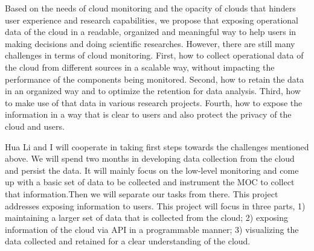   Based on the needs of cloud monitoring and the opacity of clouds that hinders user experience and research capabilities, we propose that exposing operational data of the cloud in a readable, organized and meaningful way to help users in making decisions and doing scientific researches. However, there are still many challenges in terms of cloud monitoring. First, how to collect operational data of the cloud from different sources in a scalable way, without impacting the performance of the components being monitored. Second, how to retain the data in an organized way and to optimize the retention for data analysis. Third, how to make use of that data in various research projects. Fourth, how to expose the information in a way that is clear to users and also protect the privacy of the cloud and users. 


  Hua Li and I will cooperate in taking first steps towards the challenges mentioned above. We will spend two months in developing data collection from the cloud and persist the data. It will mainly focus on the low-level monitoring and come up with a basic set of data to be collected and instrument the MOC to collect that information.Then we will separate our tasks from there. This project addresses exposing information to users. This project will focus in three parts, 1) maintaining a larger set of data that is collected from the cloud; 2) exposing information of the cloud via API in a programmable manner; 3) visualizing the data collected and retained for a clear understanding of the cloud.
